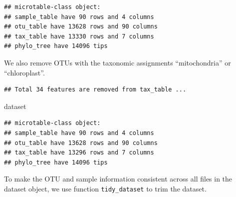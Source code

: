 \documentclass[
]{book}
\newenvironment{Shaded}{\begin{snugshade}}{\end{snugshade}}
\newcommand{\AttributeTok}[1]{\textcolor[rgb]{0.77,0.63,0.00}{#1}}
\newcommand{\CommentTok}[1]{\textcolor[rgb]{0.56,0.35,0.01}{\textit{#1}}}
\newcommand{\FunctionTok}[1]{\textcolor[rgb]{0.00,0.00,0.00}{#1}}
\newcommand{\NormalTok}[1]{#1}
\newcommand{\SpecialCharTok}[1]{\textcolor[rgb]{0.00,0.00,0.00}{#1}}
\newcommand{\StringTok}[1]{\textcolor[rgb]{0.31,0.60,0.02}{#1}}
\begin{document}
\begin{verbatim}
## microtable-class object:
## sample_table have 90 rows and 4 columns
## otu_table have 13628 rows and 90 columns
## tax_table have 13330 rows and 7 columns
## phylo_tree have 14096 tips
\end{verbatim}

We also remove OTUs with the taxonomic assignments ``mitochondria'' or ``chloroplast''.

\begin{Shaded}
\end{Shaded}

\begin{verbatim}
## Total 34 features are removed from tax_table ...
\end{verbatim}

\begin{Shaded}
\begin{Highlighting}[]
\NormalTok{dataset}
\end{Highlighting}
\end{Shaded}

\begin{verbatim}
## microtable-class object:
## sample_table have 90 rows and 4 columns
## otu_table have 13628 rows and 90 columns
## tax_table have 13296 rows and 7 columns
## phylo_tree have 14096 tips
\end{verbatim}

To make the OTU and sample information consistent across all files in the dataset object, we use function \texttt{tidy\_dataset} to trim the dataset.

\begin{Shaded}
\end{Shaded}
\end{document}
